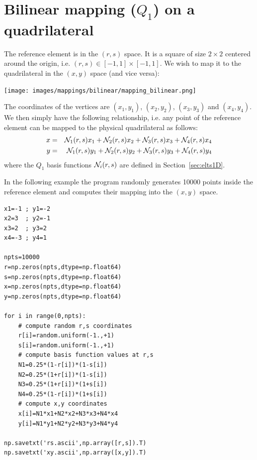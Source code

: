\section{Bilinear mapping ($Q_1$) on a quadrilateral}

The  reference element 
is in the $(r,s)$ space. It is a square of size $2\times2$ 
centered around the origin, i.e. $(r,s)\in[-1,1]\times[-1,1]$. 
We wish to map it to the quadrilateral in the $(x,y)$ space 
(and vice versa):

\begin{center}
\texttt{[image: images/mappings/bilinear/mapping\_bilinear.png]}
\end{center}

The coordinates of the vertices are 
$(x_1,y_1)$, $(x_2,y_2)$, $(x_3,y_3)$ and $(x_4,y_4)$.
We then simply have the 
following relationship, i.e. any point of the reference element 
can be mapped to the physical quadrilateral as follows:
\begin{eqnarray}
x&=& {\mathcal{N}}_1(r,s) x_1 + {\mathcal{N}}_2(r,s) x_2 + {\mathcal{N}}_3(r,s) x_3 + {\mathcal{N}}_4(r,s) x_4 \\
y&=& {\mathcal{N}}_1(r,s) y_1 + {\mathcal{N}}_2(r,s) y_2 + {\mathcal{N}}_3(r,s) y_3 + {\mathcal{N}}_4(r,s) y_4 \label{mapppQ1a} 
\end{eqnarray} 
where the $Q_1$ basis functions ${\mathcal{N}}_i(r,s)$ are defined in Section~\ref{sec:elts1D}.

In the following example the program randomly generates 10000 points 
inside the reference 
element and computes their mapping into the $(x,y)$ space. 

\begin{lstlisting}
x1=-1 ; y1=-2
x2=3  ; y2=-1
x3=2  ; y3=2
x4=-3 ; y4=1

npts=10000
r=np.zeros(npts,dtype=np.float64)   
s=np.zeros(npts,dtype=np.float64)   
x=np.zeros(npts,dtype=np.float64)   
y=np.zeros(npts,dtype=np.float64)   

for i in range(0,npts):
    # compute random r,s coordinates
    r[i]=random.uniform(-1.,+1)
    s[i]=random.uniform(-1.,+1)
    # compute basis function values at r,s
    N1=0.25*(1-r[i])*(1-s[i])
    N2=0.25*(1+r[i])*(1-s[i])
    N3=0.25*(1+r[i])*(1+s[i])
    N4=0.25*(1-r[i])*(1+s[i])
    # compute x,y coordinates
    x[i]=N1*x1+N2*x2+N3*x3+N4*x4
    y[i]=N1*y1+N2*y2+N3*y3+N4*y4

np.savetxt('rs.ascii',np.array([r,s]).T)
np.savetxt('xy.ascii',np.array([x,y]).T)
\end{lstlisting}

